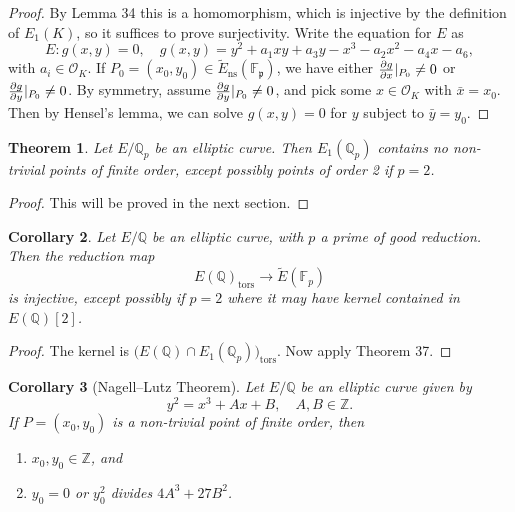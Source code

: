 \documentclass[a4paper]{article}
\newtheorem{theorem}{Theorem}
\newtheorem{corollary}[theorem]{Corollary}
\theoremstyle{definition}
\newcommand{\tors}{\mathrm{tors}}
\newcommand{\ns}{\mathrm{ns}}
\newcommand{\p}{\mathfrak{p}}
\renewcommand{\O}{\mathcal{O}}
\newcommand{\F}{\mathbb{F}}
\newcommand{\Z}{\mathbb{Z}}
\newcommand{\Q}{\mathbb{Q}}
\begin{document}
\begin{proof}
    By Lemma 34 this is a homomorphism, which is injective by the definition of
    $E_1(K)$, so it suffices to prove surjectivity. Write the equation for $E$
    as
    \begin{equation*}
        E:g(x,y)=0,\quad g(x,y)=y^2+a_1xy+a_3y-x^3-a_2x^2-a_4x-a_6,
    \end{equation*}
    with $a_i\in\O_K$. If $P_0=(x_0,y_0)\in\tilde E_\ns(\F_\p)$, we have either
    $\pdv{g}{x}|_{P_0}\ne0$ or $\pdv{g}{y}|_{P_0}\ne0$. By symmetry, assume
    $\pdv{g}{y}|_{P_0}\ne0$, and pick some $x\in\O_K$ with $\bar x=x_0$. Then by
    Hensel's lemma, we can solve $g(x,y)=0$ for $y$ subject to $\bar y=y_0$.
\end{proof}

\begin{theorem}
    Let $E/\Q_p$ be an elliptic curve. Then $E_1(\Q_p)$ contains no non-trivial
    points of finite order, except possibly points of order 2 if $p=2$.
\end{theorem}

\begin{proof}
    This will be proved in the next section.
\end{proof}

\begin{corollary}
    Let $E/\Q$ be an elliptic curve, with $p$ a prime of good reduction. Then
    the reduction map
    \begin{equation*}
        E(\Q)_\tors \to \tilde E(\F_p)
    \end{equation*}
    is injective, except possibly if $p=2$ where it may have kernel contained in
    $E(\Q)[2]$.
\end{corollary}

\begin{proof}
    The kernel is $\bigl(E(\Q)\cap E_1(\Q_p)\bigr)_\tors$. Now apply Theorem 37.
\end{proof}

\begin{corollary}[Nagell--Lutz Theorem]
    Let $E/\Q$ be an elliptic curve given by
    \begin{equation*}
        y^2 = x^3 + Ax + B,\quad A,B\in\Z.
    \end{equation*}
    If $P=(x_0,y_0)$ is a non-trivial point of finite order, then
    \begin{enumerate}[label=(\roman*)]
        \item $x_0,y_0\in\Z$, and
        \item $y_0=0$ or $y_0^2$ divides $4A^3+27B^2$.
    \end{enumerate}
\end{corollary}
\end{document}
